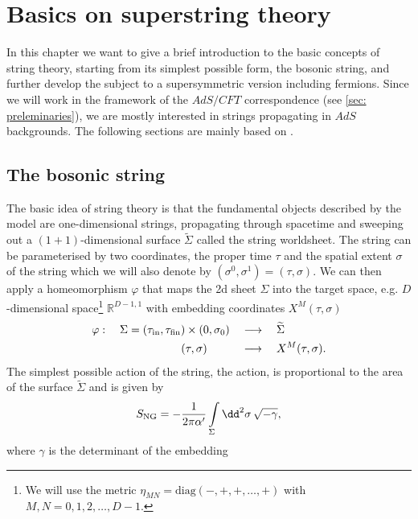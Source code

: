 \chapter{Basics on superstring theory}\label{ch: string_basics}
In this chapter we want to give a brief introduction to the basic concepts of string theory, starting from its simplest possible form, the bosonic string, and further develop the subject to a supersymmetric version including fermions. Since we will work in the framework of the $AdS/CFT$ correspondence (see \autoref{sec: preleminaries}), we are mostly interested in strings propagating in $AdS$ backgrounds. The following sections are mainly based on \cite{Polchinski:1998rq,Polchinski:1998rr,Ammon:2015wua,Becker:2007zj}.
%
%
%
%
%
%
%
\section{The bosonic string}
The basic idea of string theory is that the fundamental objects described by the model are one-dimensional strings, propagating through spacetime and sweeping out a $(1+1)$-dimensional surface $\widetilde{\Sigma}$ called the string worldsheet. The string can be parameterised by two coordinates, the proper time $\tau$ and the spatial extent $\sigma$ of the string which we will also denote by $(\sigma^{0},\sigma^{1})=(\tau,\sigma)$. We can then apply a homeomorphism $\varphi$ that maps the 2d sheet $\Sigma$ into the target space, e.g. $D$-dimensional  space\footnote{We will use the metric $\eta_{MN}=\text{diag}(-,+,+,\ldots,+)$ with $M,N=0,1,2,\ldots,D-1.$} $\mathbb{R}^{D-1,1}$ with embedding coordinates $X^{M}(\tau,\sigma)$
%
%
\begin{equation}
\begin{alignedat}{3}
\varphi :\quad  \Sigma = (\tau_{\rm in},\tau_{\rm fin}) \times (0,\sigma_{0}) \quad &\longrightarrow \quad \widetilde{\Sigma} \\
(\tau,\sigma) \qquad\quad &\longrightarrow \quad X^{M}(\tau,\sigma).
\end{alignedat}
\end{equation}
%
%
The simplest possible action of the string, the  action, is proportional to the area of the surface $\widetilde{\Sigma}$ and is given by
%
%
\begin{equation}
S_{\rm NG} = -\frac{1}{2\pi\alpha'} \int\limits_{\Sigma} \dd^{2}\sigma \, \sqrt{-\gamma},
\end{equation}
%
%
where $\gamma$ is the  determinant of the embedding
